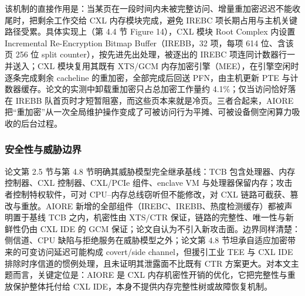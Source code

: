 \documentclass[11pt]{ctexart}
\begin{document}
该机制的直接作用是：当某页在一段时间内未被完整访问、增量重加密迟迟不能收尾时，把剩余工作交给 CXL 内存模块完成，避免 IREBC 项长期占用与主机关键路径受累。具体实现上（第 4.4 节 Figure 14），CXL 模块 Root Complex 内设置 Incremental Re-Encryption Bitmap Buffer（IREBB，32 项，每项 614 位、含该页 256 位 split counter），按先进先出处理，被逐出的 IREBC 项连同计数器行一并送入；CXL 模块复用其既有 XTS/GCM 内存加密引擎（MEE），在引擎空闲时逐条完成剩余 cacheline 的重加密，全部完成后回送 PFN，由主机更新 PTE 与计数器缓存。论文的实测中卸载重加密只占总加密工作量约 4.1\%；仅当访问恰好落在 IREBB 队首页时才短暂阻塞，而这些页本来就是冷页。三者合起来，AIORE 把“重加密”从一次全局维护操作变成了可被访问行为平摊、可被设备侧空闲算力吸收的后台过程。\par
\subsubsection{安全性与威胁边界}
论文第 2.5 节与第 4.8 节明确其威胁模型完全继承基线：TCB 包含处理器、内存控制器、CXL 控制器、CXL/PCIe 组件、enclave VM 与处理器保留内存；攻击者控制特权软件，可对 CPU--内存总线窃听但不能修改，对 CXL 链路可截获、篡改与重放。AIORE 新增的全部组件（IREBC、IREBB、热度检测缓存）都被声明置于基线 TCB 之内，机密性由 XTS/CTR 保证，链路的完整性、唯一性与新鲜性仍由 CXL IDE 的 GCM 保证；论文自认为不引入新攻击面。边界同样清楚：侧信道、CPU 缺陷与拒绝服务在威胁模型之外；论文第 4.8 节坦承自适应加密带来的可变访问延迟可能构成 covert/side channel，但援引工业 TEE 与 CXL IDE 排除时序信道的惯例处理，且未证明其泄露面不比既有 CTR 方案更大。对本文主题而言，关键定位是：AIORE 是 CXL 内存机密性开销的优化，它把完整性与重放保护整体托付给 CXL IDE，本身不提供内存完整性树或故障恢复机制。\par
\end{document}

